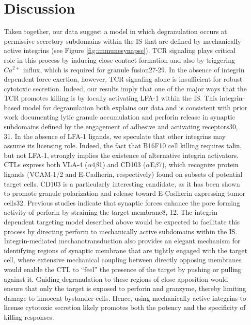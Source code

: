 \section{Discussion}
Taken together, our data suggest a model in which degranulation occurs at permissive secretory subdomains within the IS that are defined by mechanically active integrins (see Figure \ref{fig:immunesynapse}). TCR signaling plays critical role in this process by inducing close contact formation and also by triggering $Ca^{2+}$ influx, which is required for granule fusion27-29. In the absence of integrin dependent force exertion, however, TCR signaling alone is insufficient for robust cytotoxic secretion. Indeed, our results imply that one of the major ways that the TCR promotes killing is by locally activating LFA-1 within the IS. This integrin-based model for degranulation both explains our data and is consistent with prior work documenting lytic granule accumulation and perforin release in synaptic subdomains defined by the engagement of adhesive and activating receptors30, 31. In the absence of LFA-1 ligands, we speculate that other integrins may assume its licensing role. Indeed, the fact that B16F10 cell killing requires talin, but not LFA-1, strongly implies the existence of alternative integrin activators. CTLs express both VLA-4 ($\alpha$4$\beta$1) and CD103 ($\alpha$E$\beta$7), which recognize protein ligands (VCAM-1/2 and E-Cadherin, respectively) found on subsets of potential target cells. CD103 is a particularly interesting candidate, as it has been shown to promote granule polarization and release toward E-Cadherin expressing tumor cells32. Previous studies indicate that synaptic forces enhance the pore forming activity of perforin by straining the target membrane8, 12. The integrin dependent targeting model described above would be expected to facilitate this process by directing perforin to mechanically active subdomains within the IS. Integrin-mediated mechanotransduction also provides an elegant mechanism for identifying regions of synaptic membrane that are tightly engaged with the target cell, where extensive mechanical coupling between directly opposing membranes would enable the CTL to “feel” the presence of the target by pushing or pulling against it. Guiding degranulation to these regions of close apposition would ensure that only the target is exposed to perforin and granzyme, thereby limiting damage to innocent bystander cells. Hence, using mechanically active integrins to license cytotoxic secretion likely promotes both the potency and the specificity of killing responses. 

